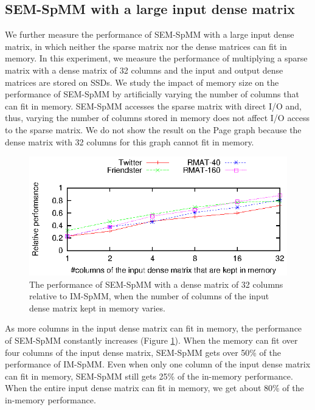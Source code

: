 \subsection{SEM-SpMM with a large input dense matrix}

We further measure the performance of SEM-SpMM with a large input dense matrix,
in which neither the sparse matrix nor the dense matrices can fit in memory.
In this experiment, we measure the performance of multiplying a sparse matrix
with a dense matrix of 32 columns and the input and output dense matrices are
stored on SSDs. We study the impact of memory size on the performance of SEM-SpMM
by artificially varying the number of columns that can fit in memory. SEM-SpMM
accesses the sparse matrix with direct I/O and, thus, varying the number of
columns stored in memory does not affect I/O access to the sparse matrix. We
do not show the result on the Page graph because the dense matrix with
32 columns for this graph cannot fit in memory.

\begin{figure}
	\begin{center}
		\footnotesize
		\includegraphics[scale=1]{SpMM_figs/spmm-32cols.eps}
		\caption{The performance of SEM-SpMM with a dense matrix of 32 columns
			relative to IM-SpMM, when the number of columns of the input dense
		matrix kept in memory varies.}
		\label{perf:spmm32}
	\end{center}
\end{figure}

As more columns in the input dense matrix can fit in memory, the performance
of SEM-SpMM constantly increases (Figure \ref{perf:spmm32}). When the memory
can fit over four columns of the input dense matrix, SEM-SpMM gets over 50\%
of the performance of IM-SpMM. Even when only one column of the input dense
matrix can fit in memory, SEM-SpMM still gets 25\% of the in-memory performance.
When the entire input dense matrix can fit in memory, we get about 80\% of
the in-memory performance.

